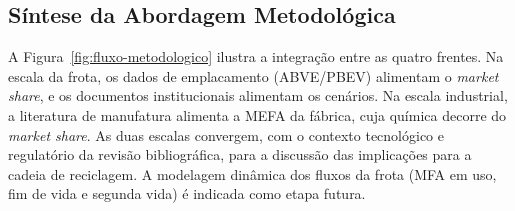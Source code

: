 \subsection{Síntese da Abordagem Metodológica}
\label{sec:met-sintese}

A Figura~\ref{fig:fluxo-metodologico} ilustra a integração entre as quatro
frentes. Na escala da frota, os dados de emplacamento (ABVE/PBEV) alimentam o
\textit{market share}, e os documentos institucionais alimentam os cenários. Na
escala industrial, a literatura de manufatura alimenta a MEFA da fábrica, cuja
química decorre do \textit{market share}. As duas escalas convergem, com o
contexto tecnológico e regulatório da revisão bibliográfica, para a discussão das
implicações para a cadeia de reciclagem. A modelagem dinâmica dos fluxos da frota (MFA em uso, fim de vida
e segunda vida) é indicada como etapa futura.

